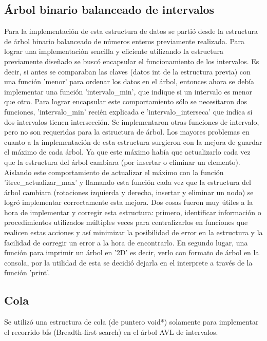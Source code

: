 \documentclass[a4paper, 12pt]{article}
\begin{document}
\subsection{Árbol binario balanceado de intervalos}
	Para la implementación de esta estructura de datos se partió desde la estructura de árbol binario balanceado de números enteros previamente realizada. Para lograr una implementación sencilla y eficiente utilizando la estructura previamente diseñado se buscó encapsular el funcionamiento de los intervalos. Es decir, si antes se comparaban las claves (datos int de la estructura previa) con una función 'menor' para ordenar los datos en el árbol, entonces ahora se debía implementar una función 'intervalo\_min', que indique si un intervalo es menor que otro. Para lograr encapsular este comportamiento sólo se necesitaron dos funciones, 'intervalo\_min' recién explicada e 'intervalo\_interseca' que indica si dos intervalos tienen intersección. Se implementaron otras funciones de intervalo, pero no son requeridas para la estructura de árbol.
    Los mayores problemas en cuanto a la implementación de esta estructura surgieron con la mejora de guardar el máximo de cada árbol. Ya que este máximo había que actualizarlo cada vez que la estructura del árbol cambiara (por insertar o eliminar un elemento). Aislando este comportamiento de actualizar el máximo con la función 'itree\_actualizar\_max' y llamando esta función cada vez que la estructura del árbol cambiara (rotaciones izquierda y derecha, insertar y eliminar un nodo) se logró implementar correctamente esta mejora.
    Dos cosas fueron muy útiles a la hora de implementar y corregir esta estructura: primero, identificar información o procedimientos utilizados múltiples veces para centralizarlos en funciones que realicen estas acciones y así minimizar la posibilidad de error en la estructura y la facilidad de corregir un error a la hora de encontrarlo. En segundo lugar, una función para imprimir un árbol en '2D' es decir, verlo con formato de árbol en la consola, por la utilidad de esta se decidió dejarla en el interprete a través de la función 'print'.

\subsection{Cola}
	Se utilizó una estructura de cola (de puntero void*) solamente para implementar el recorrido bfs (Breadth-first search) en el árbol AVL de intervalos.
\end{document}

